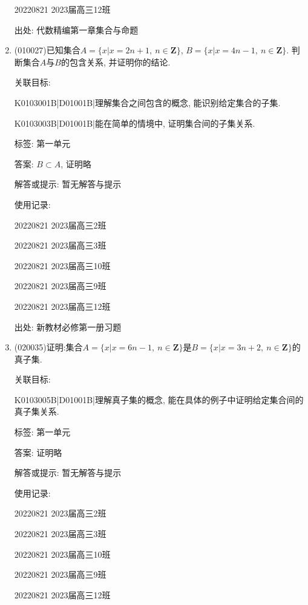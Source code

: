 \documentclass[10pt,a4paper]{article}
\begin{document}
\begin{enumerate}[1.]
20220821	2023届高三12班	


出处: 代数精编第一章集合与命题
\newpage
\item{ (010027)}已知集合$A=\{x|x=2n+1,\ n\in \mathbf{Z}\}$, $B=\{x|x=4n-1,\ n\in \mathbf{Z}\}$. 判断集合$A$与$B$的包含关系, 并证明你的结论.


关联目标:

K0103001B|D01001B|理解集合之间包含的概念, 能识别给定集合的子集.

K0103003B|D01001B|能在简单的情境中, 证明集合间的子集关系.



标签: 第一单元

答案: $B\subset A$, 证明略

解答或提示: 暂无解答与提示

使用记录:

20220821	2023届高三2班	

20220821	2023届高三3班	

20220821	2023届高三10班	

20220821	2023届高三9班	

20220821	2023届高三12班	


出处: 新教材必修第一册习题
\newpage
\item{ (020035)}证明:集合$A=\{x|x=6n-1, \ n\in\mathbf{Z}\}$是$B=\{x|x=3n+2, \ n\in\mathbf{Z}\}$的真子集.


关联目标:

K0103005B|D01001B|理解真子集的概念, 能在具体的例子中证明给定集合间的真子集关系.



标签: 第一单元

答案: 证明略

解答或提示: 暂无解答与提示

使用记录:

20220821	2023届高三2班	

20220821	2023届高三3班	

20220821	2023届高三10班	

20220821	2023届高三9班	

20220821	2023届高三12班	



\end{enumerate}
\end{document}
